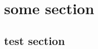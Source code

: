 \documentclass[class=../../utsthesis, crop=false]{standalone}
\begin{document}

\chapter{some section}

\blindtext
\blindtext

\blindtext
\blindtext

\section{test section}
\blindtext
\blindtext

\putbib
\clearpage
\end{document}
